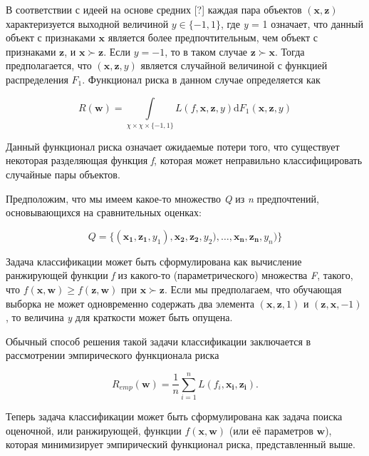 \documentclass[12pt,a4paper,oneside]{article}
\begin{document}
\par
В соответствии с идеей на основе средних [?] каждая пара объектов \((\mathbf{x}, \mathbf{z})\) характеризуется выходной величиной \(y \in \{-1,1\}\), где \emph{y} = 1 означает, что данный объект с признаками \(\mathbf{x}\) является более предпочтительным, чем объект с признаками \(\mathbf{z}\), и \(\mathbf{x} \succ \mathbf{z}\). Если \(y = -1\), то в таком случае \(\mathbf{z} \succ \mathbf{x}\). Тогда предполагается, что \((\mathbf{x}, \mathbf{z}, y)\) является случайной величиной с функцией распределения \(F_1\). Функционал риска в данном случае определяется как

\[
R(\mathbf{w}) = \int \limits_{\chi \times \chi \times \{-1, 1\}} L(f, \mathbf{x}, \mathbf{z}, y) \mathrm{d} F_1(\mathbf{x}, \mathbf{z}, y)
\]

\par
Данный функционал риска означает ожидаемые потери того, что существует некоторая разделяющая функция \emph{f}, которая может неправильно классифицировать случайные пары объектов. 

\par
Предположим, что мы имеем какое-то множество \emph{Q} из \emph{n} предпочтений, основывающихся на сравнительных оценках:

\[
Q = \{(\mathbf{x_1}, \mathbf{z_1}, y_1), \mathbf{x_2}, \mathbf{z_2}, y_2), \dots, \mathbf{x_n}, \mathbf{z_n}, y_n)\}
\]

\par
Задача классификации может быть сформулирована как вычисление ранжирующей функции \emph{f} из какого-то (параметрического) множества \emph{F}, такого, что \(f(\mathbf{x}, \mathbf{w}) \geq f(\mathbf{z}, \mathbf{w})\) при \(\mathbf{x} \succ \mathbf{z}\). 
Если мы предполагаем, что обучающая выборка не может одновременно содержать два элемента \((\mathbf{x}, \mathbf{z}, 1)\) и \((\mathbf{z}, \mathbf{x}, -1)\), то величина \emph{y} для краткости может быть опущена. 

\par
Обычный способ решения такой задачи классификации заключается в рассмотрении эмпирического функционала риска

\[
R_{emp}(\mathbf{w}) = \frac{1}{n} \sum \limits_{i=1}^n L(f_i, \mathbf{x_i}, \mathbf{z_i}).
\]

Теперь задача классификации может быть сформулирована как задача поиска оценочной, или ранжирующей, функции \(f(\mathbf{x}, \mathbf{w})\) (или её параметров \(\mathbf{w}\)), которая минимизирует эмпирический функционал риска, представленный выше. 
\end{document}

